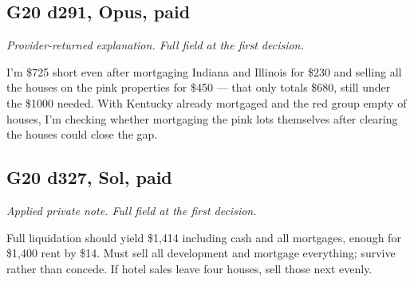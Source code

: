 \subsection*{G20 d291, Opus, paid}
{\small\textit{Provider-returned explanation. Full field at the first decision.}\par I'm \$725 short even after mortgaging Indiana and Illinois for \$230 and selling all the houses on the pink properties for \$450 — that only totals \$680, still under the \$1000 needed. With Kentucky already mortgaged and the red group empty of houses, I'm checking whether mortgaging the pink lots themselves after clearing the houses could close the gap.\par 
\par 
\par}

\subsection*{G20 d327, Sol, paid}
{\small\textit{Applied private note. Full field at the first decision.}\par Full liquidation should yield \$1,414 including cash and all mortgages, enough for \$1,400 rent by \$14. Must sell all development and mortgage everything; survive rather than concede. If hotel sales leave four houses, sell those next evenly.\par}
